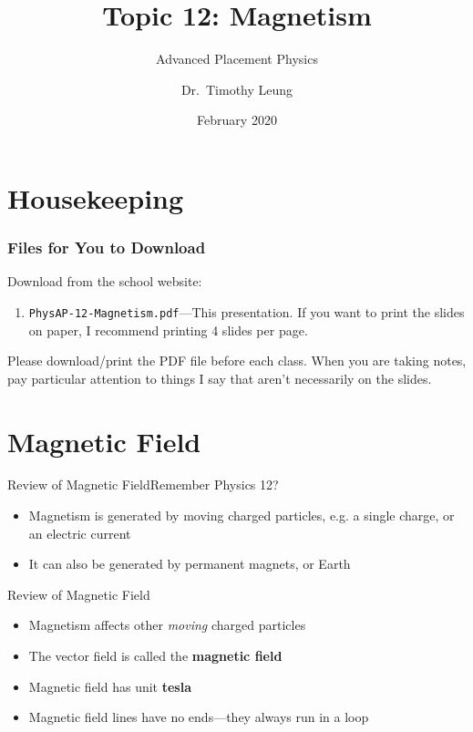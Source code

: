 \documentclass[12pt,aspectratio=169]{beamer}
\title{Topic 12: Magnetism}
\subtitle{Advanced Placement Physics}
\author[TML]{Dr.\ Timothy Leung}
\institute{Olympiads School, Toronto, ON, Canada}
\date{February 2020}
\begin{document}
\begin{frame}
  \maketitle
\end{frame}


\section{Housekeeping}

\begin{frame}
  \frametitle{Files for You to Download}
  Download from the school website:
  \begin{enumerate}
  \item\texttt{PhysAP-12-Magnetism.pdf}---This presentation. If you want to
    print the slides on paper, I recommend printing 4 slides per page.
  \end{enumerate}

  \vspace{.2in}Please download/print the PDF file before each class. When you
  are taking notes, pay particular attention to things I say that aren't
  necessarily on the slides.
\end{frame}



\section{Magnetic Field}

\begin{frame}{Review of Magnetic Field}{Remember Physics 12?}
  \begin{itemize}
  \item Magnetism is generated by moving charged particles, e.g.
    a single charge, or an electric current
  \item It can also be generated by permanent magnets, or Earth
  \end{itemize}
\end{frame}



\begin{frame}{Review of Magnetic Field}
  \begin{itemize}
  \item Magnetism affects other \emph{moving} charged particles
  \item The vector field is called the \textbf{magnetic field}
  \item Magnetic field has unit \textbf{tesla}
  \item Magnetic field lines have no ends---they always run in a loop
  \end{itemize}
\end{frame}
\end{document}
